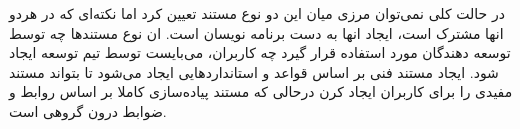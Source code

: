 در حالت کلی نمی‌توان مرزی میان این دو نوع مستند تعیین کرد اما نکته‌ای که در هردو
انها مشترک است، ایجاد انها به دست برنامه نویسان است. ان نوع مستندها چه توسط
توسعه دهندگان مورد استفاده قرار گیرد چه کاربران، می‌بایست توسط تیم توسعه ایجاد
شود. ایجاد مستند فنی بر اساس قواعد و استانداردهایی ایجاد می‌شود تا بتواند مستند
مفیدی را برای کاربران ایجاد کرن درحالی که مستند پیاده‌سازی کاملا بر اساس روابط و
ضوابط درون گروهی است. 
